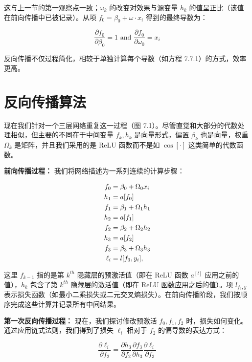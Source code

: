 \documentclass[lang=cn,newtx,10pt,scheme=chinese]{elegantbook}
\begin{document}
这与上一节的第一观察点一致；\(\omega_k\) 的改变对效果与源变量 \(h_k\) 的值呈正比（该值在前向传播中已被记录）。从项 \(f_0 = \beta_0 + \omega \cdot x_i\) 得到的最终导数为：

\begin{equation}
\frac{\partial f_0}{\partial \beta_0} = 1 \text{ and } \frac{\partial f_0}{\partial \omega_0} = x_i 
\end{equation}

反向传播不仅过程简化，相较于单独计算每个导数（如方程 7.7.1）的方式，效率更高。

\section{反向传播算法}
现在我们针对一个三层网络重复这一过程（图 7.1）。尽管直觉和大部分的代数处理相似，但主要的不同在于中间变量 \(f_k, h_k\) 是向量形式，偏置 \(\beta_k\) 也是向量，权重 \(\Omega_k\) 是矩阵，并且我们采用的是 ReLU 函数而不是如 \(\cos[\cdot]\) 这类简单的代数函数。

\textbf{前向传播过程：} 我们将网络描述为一系列连续的计算步骤：

\begin{align}
f_0 &= \beta_0 + \Omega_0x_i \notag \\
h_1 &= a[f_0] \notag \\
f_1 &= \beta_1 + \Omega_1h_1 \notag \\
h_2 &= a[f_1] \notag \\
f_2 &= \beta_2 + \Omega_2h_2 \notag \\
h_3 &= a[f_2] \notag \\
f_3 &= \beta_3 + \Omega_3h_3 \notag \\
\ell_i &= l[f_3, y_i], 
\end{align} 

这里 \(f_{k-1}\) 指的是第 \(k^{th}\) 隐藏层的预激活值（即在 ReLU 函数 \(a^{[l]}\) 应用之前的值），\(h_k\) 包含了第 \(k^{th}\) 隐藏层的激活值（即在 ReLU 函数应用之后的值）。项 \(l_{f_3, y}\) 表示损失函数（如最小二乘损失或二元交叉熵损失）。在前向传播阶段，我们按顺序完成这些计算并记录所有中间结果。

\textbf{第一次反向传播过程：} 现在，我们探讨修改预激活 \(f_0, f_1, f_2\) 时，损失如何变化。通过应用链式法则，我们得到了损失 \(\ell_i\) 相对于 \(f_2\) 的偏导数的表达方式：

\begin{equation}
\frac{\partial \ell_i}{\partial f_2} = \frac{\partial h_3}{\partial f_2} \frac{\partial f_3}{\partial h_3} \frac{\partial \ell_i}{\partial f_3} 
\end{equation}
\end{document}
